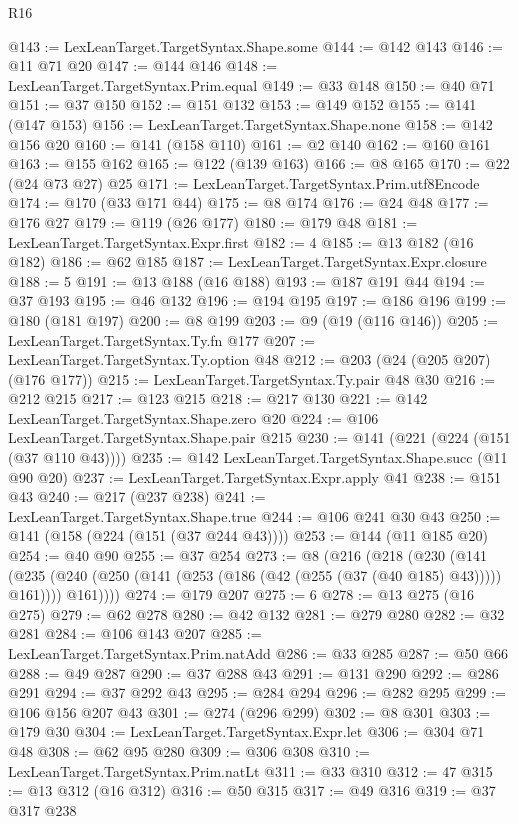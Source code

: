 \begin{lexlean}{R16}
\begin{coremodule}
{{{{{{{{{{{{{{{{{@143 := LexLeanTarget.TargetSyntax.Shape.some
@144 := @142 @143
@146 := @11 @71 @20
@147 := @144 @146
@148 := LexLeanTarget.TargetSyntax.Prim.equal
@149 := @33 @148
@150 := @40 @71
@151 := @37 @150
@152 := @151 @132
@153 := @149 @152
@155 := @141 (@147 @153)
@156 := LexLeanTarget.TargetSyntax.Shape.none
@158 := @142 @156 @20
@160 := @141 (@158 @110)
@161 := @2 @140
@162 := @160 @161
@163 := @155 @162
@165 := @122 (@139 @163)
@166 := @8 @165
@170 := @22 (@24 @73 @27) @25
@171 := LexLeanTarget.TargetSyntax.Prim.utf8Encode
@174 := @170 (@33 @171 @44)
@175 := @8 @174
@176 := @24 @48
@177 := @176 @27
@179 := @119 (@26 @177)
@180 := @179 @48
@181 := LexLeanTarget.TargetSyntax.Expr.first
@182 := 4
@185 := @13 @182 (@16 @182)
@186 := @62 @185
@187 := LexLeanTarget.TargetSyntax.Expr.closure
@188 := 5
@191 := @13 @188 (@16 @188)
@193 := @187 @191 @44
@194 := @37 @193
@195 := @46 @132
@196 := @194 @195
@197 := @186 @196
@199 := @180 (@181 @197)
@200 := @8 @199
@203 := @9 (@19 (@116 @146))
@205 := LexLeanTarget.TargetSyntax.Ty.fn @177
@207 := LexLeanTarget.TargetSyntax.Ty.option @48
@212 := @203 (@24 (@205 @207) (@176 @177))
@215 := LexLeanTarget.TargetSyntax.Ty.pair @48 @30
@216 := @212 @215
@217 := @123 @215
@218 := @217 @130
@221 := @142 LexLeanTarget.TargetSyntax.Shape.zero @20
@224 := @106 LexLeanTarget.TargetSyntax.Shape.pair @215
@230 := @141 (@221 (@224 (@151 (@37 @110 @43))))
@235 := @142 LexLeanTarget.TargetSyntax.Shape.succ (@11 @90 @20)
@237 := LexLeanTarget.TargetSyntax.Expr.apply @41
@238 := @151 @43
@240 := @217 (@237 @238)
@241 := LexLeanTarget.TargetSyntax.Shape.true
@244 := @106 @241 @30 @43
@250 := @141 (@158 (@224 (@151 (@37 @244 @43))))
@253 := @144 (@11 @185 @20)
@254 := @40 @90
@255 := @37 @254
@273 := @8
    (@216
      (@218
        (@230
          (@141
            (@235 (@240 (@250 (@141 (@253 (@186 (@42 (@255 (@37 (@40 @185) @43))))) @161))))
            @161))))
@274 := @179 @207
@275 := 6
@278 := @13 @275 (@16 @275)
@279 := @62 @278
@280 := @42 @132
@281 := @279 @280
@282 := @32 @281
@284 := @106 @143 @207
@285 := LexLeanTarget.TargetSyntax.Prim.natAdd
@286 := @33 @285
@287 := @50 @66
@288 := @49 @287
@290 := @37 @288 @43
@291 := @131 @290
@292 := @286 @291
@294 := @37 @292 @43
@295 := @284 @294
@296 := @282 @295
@299 := @106 @156 @207 @43
@301 := @274 (@296 @299)
@302 := @8 @301
@303 := @179 @30
@304 := LexLeanTarget.TargetSyntax.Expr.let
@306 := @304 @71 @48
@308 := @62 @95 @280
@309 := @306 @308
@310 := LexLeanTarget.TargetSyntax.Prim.natLt
@311 := @33 @310
@312 := 47
@315 := @13 @312 (@16 @312)
@316 := @50 @315
@317 := @49 @316
@319 := @37 @317 @238
}}}}}}}}}}}}}}}}}
\end{coremodule}
\end{lexlean}
